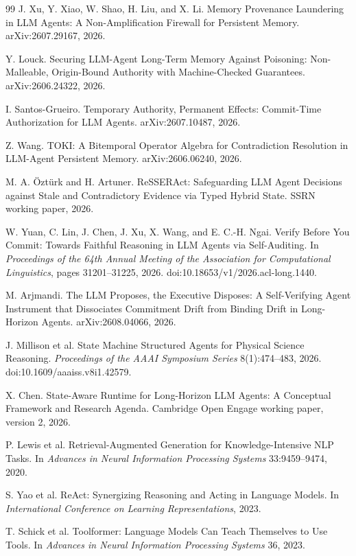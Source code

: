 \documentclass[11pt]{article}
\begin{document}
\begin{thebibliography}{99}
 J. Xu, Y. Xiao, W. Shao, H. Liu, and X. Li. Memory Provenance Laundering in LLM Agents: A Non-Amplification Firewall for Persistent Memory. arXiv:2607.29167, 2026.

 Y. Louck. Securing LLM-Agent Long-Term Memory Against Poisoning: Non-Malleable, Origin-Bound Authority with Machine-Checked Guarantees. arXiv:2606.24322, 2026.

 I. Santos-Grueiro. Temporary Authority, Permanent Effects: Commit-Time Authorization for LLM Agents. arXiv:2607.10487, 2026.

 Z. Wang. TOKI: A Bitemporal Operator Algebra for Contradiction Resolution in LLM-Agent Persistent Memory. arXiv:2606.06240, 2026.

 M. A. \"Ozt\"urk and H. Artuner. ReSSERAct: Safeguarding LLM Agent Decisions against Stale and Contradictory Evidence via Typed Hybrid State. SSRN working paper, 2026.

 W. Yuan, C. Lin, J. Chen, J. Xu, X. Wang, and E. C.-H. Ngai. Verify Before You Commit: Towards Faithful Reasoning in LLM Agents via Self-Auditing. In \emph{Proceedings of the 64th Annual Meeting of the Association for Computational Linguistics}, pages 31201--31225, 2026. doi:10.18653/v1/2026.acl-long.1440.

 M. Arjmandi. The LLM Proposes, the Executive Disposes: A Self-Verifying Agent Instrument that Dissociates Commitment Drift from Binding Drift in Long-Horizon Agents. arXiv:2608.04066, 2026.

 J. Millison et al. State Machine Structured Agents for Physical Science Reasoning. \emph{Proceedings of the AAAI Symposium Series} 8(1):474--483, 2026. doi:10.1609/aaaiss.v8i1.42579.

 X. Chen. State-Aware Runtime for Long-Horizon LLM Agents: A Conceptual Framework and Research Agenda. Cambridge Open Engage working paper, version 2, 2026.

 P. Lewis et al. Retrieval-Augmented Generation for Knowledge-Intensive NLP Tasks. In \emph{Advances in Neural Information Processing Systems} 33:9459--9474, 2020.

 S. Yao et al. ReAct: Synergizing Reasoning and Acting in Language Models. In \emph{International Conference on Learning Representations}, 2023.

 T. Schick et al. Toolformer: Language Models Can Teach Themselves to Use Tools. In \emph{Advances in Neural Information Processing Systems} 36, 2023.


\end{thebibliography}
\end{document}
